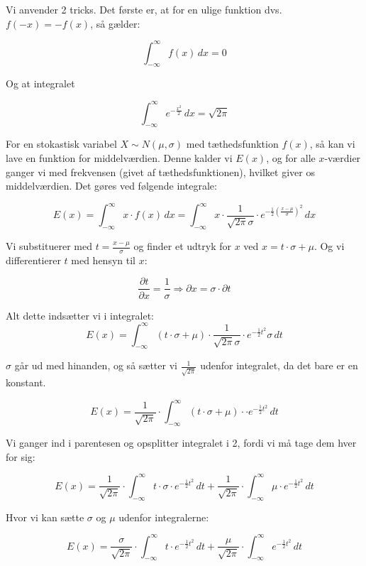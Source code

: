 \documentclass{article}
\makeatletter
\newenvironment{proofw}{\par
  \pushQED{\qed}%
  \normalfont \topsep6\p@\@plus6\p@\relax
  \trivlist
  \item[]\ignorespaces
}{%
  \popQED\endtrivlist\@endpefalse
}
\makeatother
\begin{document}
\begin{proofw}
    
Vi anvender 2 tricks.
Det første er, at for en ulige funktion dvs. $f(-x)=-f(x)$, så gælder:

$$
    \int_{-\infty}^{\infty} f(x) \,dx=0
$$

Og at integralet

$$
    \int_{-\infty}^{\infty} e^{
        -\frac{x^2}{2}
    }\,dx = \sqrt{2\pi}
$$

For en stokastisk variabel $X \sim N(\mu, \sigma)$
med tæthedsfunktion $f(x)$, så kan vi lave en funktion for middelværdien.
Denne kalder vi $E(x)$, og for alle $x$-værdier ganger vi med frekvensen (givet af tæthedsfunktionen),
hvilket giver os middelværdien. Det gøres ved følgende integrale:

$$
    E(x)= \int_{-\infty}^{\infty}
    x \cdot f(x) \,dx
    =
     \int_{-\infty}^{\infty}
    x \cdot \frac{1}{\sqrt{2\pi} \sigma}
    \cdot e^{
        -\frac{1}{2} (\frac{x-\mu}{\sigma})^2
    }
    \,dx
$$

Vi substituerer med $t=\frac{x-\mu}{\sigma}$ og finder et udtryk for
$x$ ved $x=t \cdot \sigma + \mu$. Og vi differentierer $t$ med hensyn til $x$:

$$
    \frac{\partial t}{\partial x}=\frac{1}{\sigma} \Rightarrow \partial x = \sigma \cdot \partial t
$$

Alt dette indsætter vi i integralet:
$$
 E(x)=\int_{-\infty}^{\infty}
    (t \cdot \sigma + \mu) \cdot \frac{1}{\sqrt{2\pi} \sigma}
    \cdot e^{
        -\frac{1}{2} t^2
    }
    \sigma \,dt
$$

$\sigma$ går ud med hinanden, og så sætter vi $\frac{1}{\sqrt{2 \pi}}$ udenfor
integralet, da det bare er en konstant.

$$
E(x)=\frac{1}{\sqrt{2\pi}} \cdot
\int_{-\infty}^{\infty}
    (t \cdot \sigma + \mu) \cdot
    \cdot e^{
        -\frac{1}{2} t^2
    }
    \,dt
$$

Vi ganger ind i parentesen og opsplitter integralet i 2,
fordi vi må tage dem hver for sig:

$$
E(x)=\frac{1}{\sqrt{2\pi}} \cdot
\int_{-\infty}^{\infty}
    t \cdot \sigma
    \cdot e^{
        -\frac{1}{2} t^2
    }
    \,dt
    +
\frac{1}{\sqrt{2\pi}} \cdot
\int_{-\infty}^{\infty}
    \mu
    \cdot e^{
        -\frac{1}{2} t^2
    }
    \,dt
$$

Hvor vi kan sætte $\sigma$ og $\mu$ udenfor integralerne:

$$
E(x)=\frac{\sigma}{\sqrt{2\pi}} \cdot
\int_{-\infty}^{\infty}
    t
    \cdot e^{
        -\frac{1}{2} t^2
    }
    \,dt
    +
\frac{\mu}{\sqrt{2\pi}} \cdot
\int_{-\infty}^{\infty}
    e^{
        -\frac{1}{2} t^2
    }
    \,dt
$$


\end{proofw}
\end{document}
